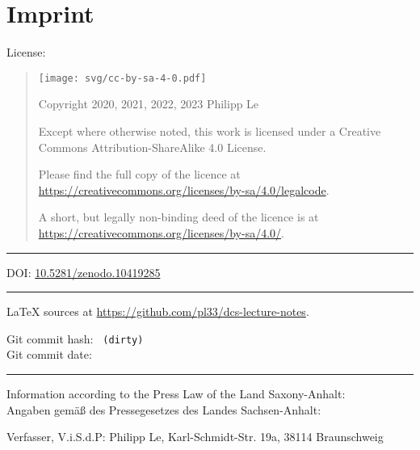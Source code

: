 %
%
%

\chapter*{Imprint}

{
\small

License:

\begin{quote}
	\texttt{[image: svg/cc-by-sa-4-0.pdf]}
		
	Copyright \textcopyright{} 2020, 2021, 2022, 2023 Philipp Le
	
	Except where otherwise noted, this work is licensed under a
	Creative Commons Attribution-ShareAlike 4.0 License.
	
	Please find the full copy of the licence at \url{https://creativecommons.org/licenses/by-sa/4.0/legalcode}.
	
	A short, but legally non-binding deed of the licence is at \url{https://creativecommons.org/licenses/by-sa/4.0/}.
\end{quote}

\vspace{1.5em}

\hrule{}

\vspace{1.5em}

DOI: \href{https://zenodo.org/doi/10.5281/zenodo.10419285}{10.5281/zenodo.10419285}

\vspace{1.5em}

\hrule{}

\vspace{1.5em}

\LaTeX{} sources at \url{https://github.com/pl33/dcs-lecture-notes}.

Git commit hash: \texttt{\VcsCommitHashLong{} \ifdefined\VcsIsClean \else (dirty) \fi}\\
Git commit date: \texttt{\VcsCommitTime}

\vspace{1.5em}

\hrule{}

\vspace{1.5em}

Information according to the Press Law of the Land Saxony-Anhalt:\\
Angaben gem\"a{}{\ss} des Pressegesetzes des Landes Sachsen-Anhalt:

Verfasser, V.i.S.d.P: Philipp Le, Karl-Schmidt-Str. 19a, 38114 Braunschweig

}
